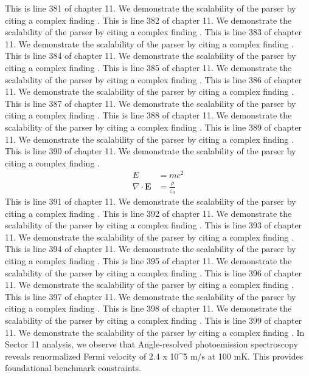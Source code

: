 This is line 381 of chapter 11. We demonstrate the scalability of the parser by citing a complex finding \cite{ref11_381}.
This is line 382 of chapter 11. We demonstrate the scalability of the parser by citing a complex finding \cite{ref11_382}.
This is line 383 of chapter 11. We demonstrate the scalability of the parser by citing a complex finding \cite{ref11_383}.
This is line 384 of chapter 11. We demonstrate the scalability of the parser by citing a complex finding \cite{ref11_384}.
This is line 385 of chapter 11. We demonstrate the scalability of the parser by citing a complex finding \cite{ref11_385}.
This is line 386 of chapter 11. We demonstrate the scalability of the parser by citing a complex finding \cite{ref11_386}.
This is line 387 of chapter 11. We demonstrate the scalability of the parser by citing a complex finding \cite{ref11_387}.
This is line 388 of chapter 11. We demonstrate the scalability of the parser by citing a complex finding \cite{ref11_388}.
This is line 389 of chapter 11. We demonstrate the scalability of the parser by citing a complex finding \cite{ref11_389}.
This is line 390 of chapter 11. We demonstrate the scalability of the parser by citing a complex finding \cite{ref11_390}.
\begin{align*}
  E &= mc^2 \\
  \nabla \cdot \mathbf{E} &= \frac{\rho}{\varepsilon_0}
\end{align*}
This is line 391 of chapter 11. We demonstrate the scalability of the parser by citing a complex finding \cite{ref11_391}.
This is line 392 of chapter 11. We demonstrate the scalability of the parser by citing a complex finding \cite{ref11_392}.
This is line 393 of chapter 11. We demonstrate the scalability of the parser by citing a complex finding \cite{ref11_393}.
This is line 394 of chapter 11. We demonstrate the scalability of the parser by citing a complex finding \cite{ref11_394}.
This is line 395 of chapter 11. We demonstrate the scalability of the parser by citing a complex finding \cite{ref11_395}.
This is line 396 of chapter 11. We demonstrate the scalability of the parser by citing a complex finding \cite{ref11_396}.
This is line 397 of chapter 11. We demonstrate the scalability of the parser by citing a complex finding \cite{ref11_397}.
This is line 398 of chapter 11. We demonstrate the scalability of the parser by citing a complex finding \cite{ref11_398}.
This is line 399 of chapter 11. We demonstrate the scalability of the parser by citing a complex finding \cite{ref11_399}.
In Sector 11 analysis, we observe that Angle-resolved photoemission spectroscopy reveals renormalized Fermi velocity of 2.4 x 10^5 m/s at 100 mK. This provides foundational benchmark constraints.
